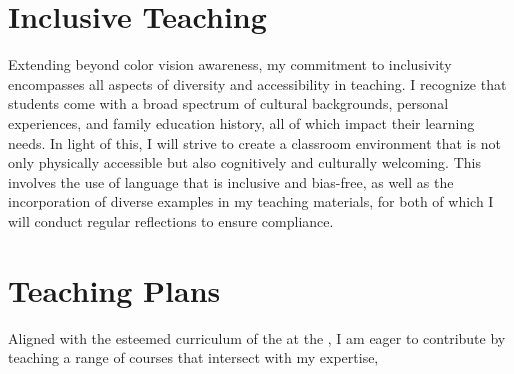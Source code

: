 \section{Inclusive Teaching}
Extending beyond color vision awareness, my commitment to inclusivity encompasses all aspects of diversity and accessibility in teaching. I recognize that students come with a broad spectrum of cultural backgrounds, personal experiences, and family education history, all of which impact their learning needs. In light of this, I will strive to create a classroom environment that is not only physically accessible but also cognitively and culturally welcoming. This involves the use of language that is inclusive and bias-free, as well as the incorporation of diverse examples in my teaching materials, for both of which I will conduct regular reflections to ensure compliance.


\section{Teaching Plans}
Aligned with the esteemed curriculum of the \appDept{} at the \appSchool{}, I am eager to contribute by teaching a range of courses that intersect with my expertise,%